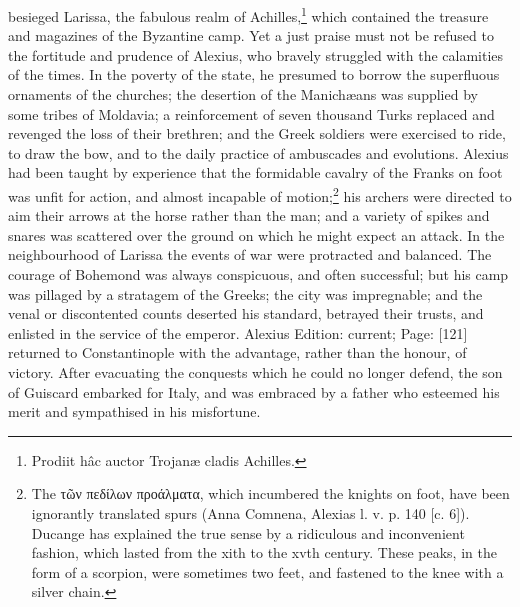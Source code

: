 besieged Larissa, the fabulous realm of Achilles,\footnote{Prodiit hâc auctor Trojanæ cladis Achilles.} which contained the treasure and magazines of the Byzantine camp. Yet a just praise must not be refused to the fortitude and prudence of Alexius, who bravely struggled with the calamities of the times. In the poverty of the state, he presumed to borrow the superfluous ornaments of the churches; the desertion of the Manichæans was supplied by some tribes of Moldavia; a reinforcement of seven thousand Turks replaced and revenged the loss of their brethren; and the Greek soldiers were exercised to ride, to draw the bow, and to the daily practice of ambuscades and evolutions. Alexius had been taught by experience that the formidable cavalry of the Franks on foot was unfit for action, and almost incapable of motion;\footnote{The \textgreek{τ\texthebrew{ῶ}ν πεδίλων προάλματα}, which incumbered the knights on foot, have been ignorantly translated spurs (Anna Comnena, Alexias l. v. p. 140 [c. 6]). Ducange has explained the true sense by a ridiculous and inconvenient fashion, which lasted from the xith to the xvth century. These peaks, in the form of a scorpion, were sometimes two feet, and fastened to the knee with a silver chain.} his archers were directed to aim their arrows at the horse rather than the man; and a variety of spikes and snares was scattered over the ground on which he might expect an attack. In the neighbourhood of Larissa the events of war were protracted and balanced. The courage of Bohemond was always conspicuous, and often successful; but his camp was pillaged by a stratagem of the Greeks; the city was impregnable; and the venal or discontented counts deserted his standard, betrayed their trusts, and enlisted in the service of the emperor. Alexius Edition: current; Page: [121] returned to Constantinople with the advantage, rather than the honour, of victory. After evacuating the conquests which he could no longer defend, the son of Guiscard embarked for Italy, and was embraced by a father who esteemed his merit and sympathised in his misfortune.

